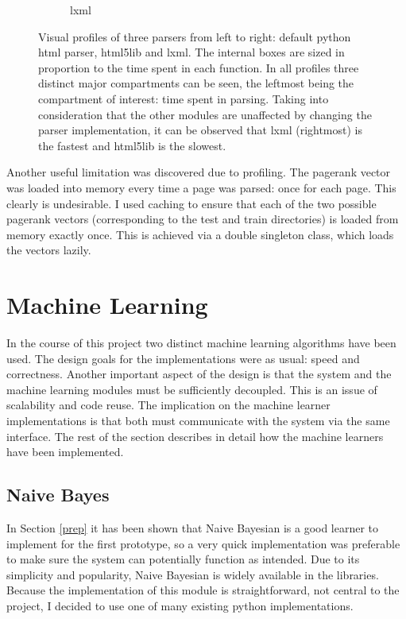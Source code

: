 \documentclass[12pt,twoside,notitlepage]{report}
\begin{document}
\begin{figure}
\begin{subfigure}[b]{.3\textwidth}
  \caption{lxml}
  \label{lxml}
\end{subfigure}
\caption{Visual profiles of three parsers from left to right: default python
html parser, html5lib and lxml. The internal boxes are sized in proportion to
the time spent in each function. In all profiles three distinct major
compartments can be seen, the leftmost being the compartment of interest: 
time spent in parsing. Taking into consideration that the other modules are unaffected by changing the parser
implementation, it can be observed that lxml (rightmost) is the fastest and
html5lib is the slowest.\label{parsers}}
\end{figure}

Another useful limitation was discovered due to profiling. The pagerank vector
was loaded into memory every time a page was parsed: once for each page. This
clearly is undesirable. I used caching to ensure that each of the two possible
pagerank vectors (corresponding to the test and train directories) is loaded
from memory exactly once. This is achieved via a double singleton class, which
loads the vectors lazily.
\section{Machine Learning}
In the course of this project two distinct machine learning algorithms have
been used. The design goals for the implementations were as usual: speed and
correctness. Another important aspect of the design is that the system and the
machine learning modules must be sufficiently decoupled. This is an issue of
scalability and code reuse. The implication on the machine learner
implementations is that both must communicate with the system via the same
interface.
The rest of the section describes in detail how the machine learners have been
implemented.

\subsection{Naive Bayes}
In Section \ref{prep} it has been shown that Naive Bayesian is a good learner
to implement for the first prototype, so a very quick implementation was
preferable to make sure the system can potentially function as intended. Due to
its simplicity and popularity, Naive Bayesian is widely available in the
libraries. Because the implementation of this module is straightforward, not
central to the project, I decided to use one of many existing python
implementations. 
\end{document}
